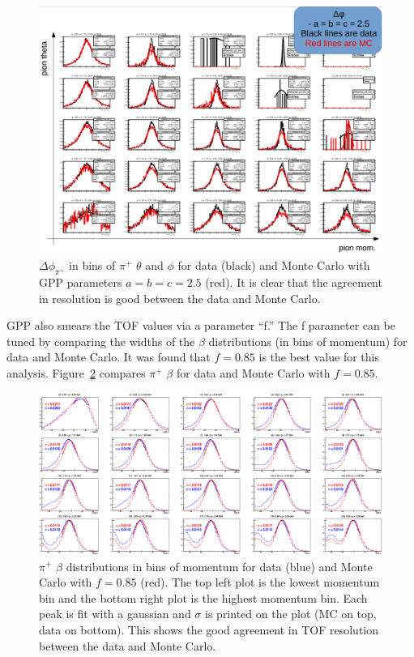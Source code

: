 %
\begin{figure}
\centering
\includegraphics[width=8.5in]{figures/DeltaPhiRes_dataAndMC.png}
\caption{$\Delta \phi_{\pi^+}$ in bins of $\pi^+$ $\theta$ and $\phi$ for data (black) and Monte Carlo with GPP parameters $a = b = c = 2.5$ (red). It is clear that the agreement in resolution is good between the data and Monte Carlo.}
\label{fig:DeltaPhiRes_dataAndMC}
\end{figure}
%

GPP also smears the TOF values via a parameter ``f.''
The f parameter can be tuned by comparing the widths of the $\beta$ distributions (in bins of momentum) for data and Monte Carlo.
It was found that $f = 0.85$ is the best value for this analysis.
Figure~\ref{fig:TOFres_dataAndMC} compares $\pi^+$ $\beta$ for data and Monte Carlo with $f = 0.85$.
%
\begin{figure}
\centering
\includegraphics[width=8.5in]{figures/TOFres_dataAndMC.png}
\caption{$\pi^+$ $\beta$ distributions in bins of momentum for data (blue) and Monte Carlo with $f = 0.85$ (red). The top left plot is the lowest momentum bin and the bottom right plot is the highest momentum bin. Each peak is fit with a gaussian and $\sigma$ is printed on the plot (MC on top, data on bottom). This shows the good agreement in TOF resolution between the data and Monte Carlo.}
\label{fig:TOFres_dataAndMC}
\end{figure}
%

